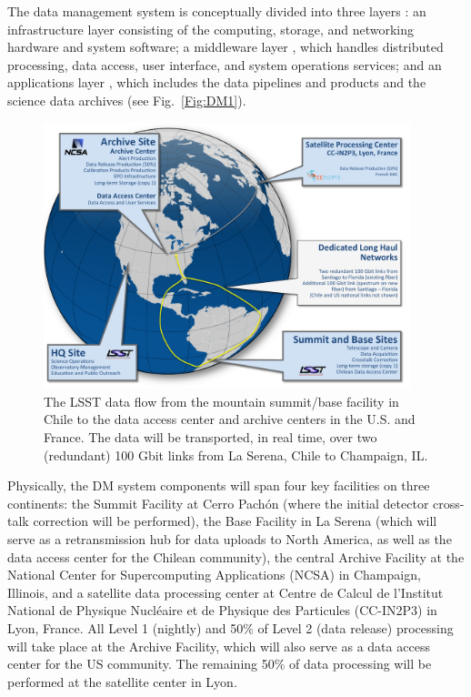 \documentclass[11pt,twoside]{article}
\begin{document}
The data management system is conceptually divided into three layers
\citep{LDM-148}: an infrastructure layer \citep{LDM-129} consisting of the computing, storage, and
networking hardware and system software; a middleware layer \citep{LDM-152}, which
handles distributed processing, data access, user interface, and
system operations services; and an applications layer
\citep{LDM-151,LDM-135,LDM-131}, which includes
the data pipelines and products and the science data archives (see
Fig.~\ref{Fig:DM1}).

\begin{figure}[!t]
%
%
\begin{center}
\includegraphics[width=0.95\textwidth,clip]{DMX2.pdf}
\end{center}
\caption{The LSST data flow from the mountain summit/base facility in
Chile to the data access center and archive centers in the U.S. and France.
The data will be transported, in real time, over two (redundant) 
100 Gbit links from La Serena, Chile to Champaign, IL.
}
\label{Fig:DM2}
\end{figure}

Physically, the DM system components will span four key facilities on three
continents: the Summit Facility at  Cerro Pach\'on (where the initial
detector cross-talk
correction will be performed), the Base Facility in La Serena (which will serve
as a retransmission hub for data
uploads to North America, as well as the data access center for the Chilean
community), the central Archive Facility at the National Center
for Supercomputing Applications (NCSA) in Champaign, Illinois, and a
satellite data processing center at Centre de Calcul de l'Institut National
de Physique Nucl\'{e}aire et de Physique des Particules (CC-IN2P3) in Lyon, France.
All Level 1 (nightly) and 50\% of Level 2 (data release) processing will take place at the
Archive Facility, which will also serve as a data access center
for the US community. The remaining 50\% of data processing will be performed at
the satellite center in Lyon.
\end{document}
